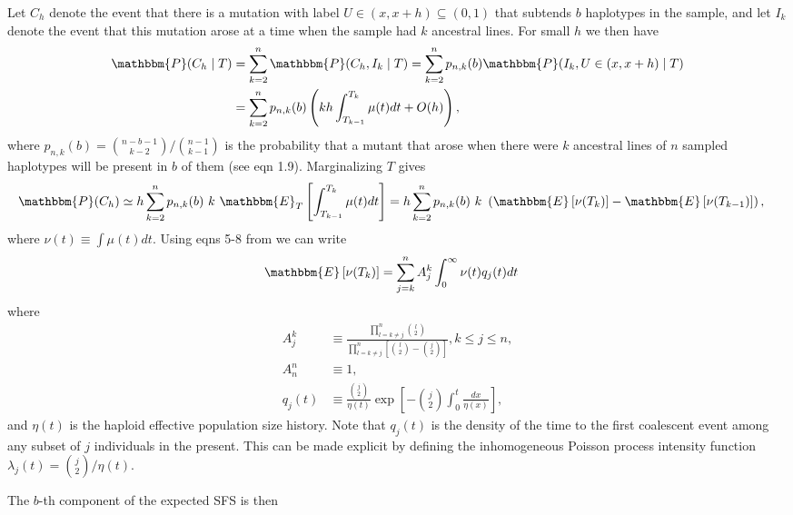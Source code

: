 \documentclass[11pt]{article}
\begin{document}
Let $C_h$ denote the event that there is a mutation with label $U\in(x,x+h)\subseteq(0,1)$ that subtends $b$ haplotypes in the sample, and let $I_k$ denote the event that this mutation arose at a time when the sample had $k$ ancestral lines.
For small $h$ we then have
\begin{align*}
\mathbbm{P}(C_h\mid T) &= \sum_{k=2}^n \mathbbm{P}(C_h, I_k\mid T) = \sum_{k=2}^n p_{n,k}(b)\mathbbm{P}(I_k, U\in(x,x+h)\mid T)\\
&= \sum_{k=2}^n p_{n,k}(b)\left(kh\int_{T_{k-1}}^{T_k}\mu(t)dt + O(h)\right),
\end{align*}
where $p_{n,k}(b) = \binom{n-b-1}{k-2}/\binom{n-1}{k-1}$ is the probability that a mutant that arose when there were $k$ ancestral lines of $n$ sampled haplotypes will be present in $b$ of them (see \cite{Griffiths1998-qf} eqn 1.9).
Marginalizing $T$ gives
\begin{align*}
\mathbbm{P}(C_h) &\simeq h\sum_{k=2}^n p_{n,k}(b)\ k\ \mathbbm{E}_T\left[\int_{T_{k-1}}^{T_k}\mu(t)dt\right] = h\sum_{k=2}^n p_{n,k}(b)\ k\ \left(\mathbbm{E}\left[\nu(T_{k})\right] - \mathbbm{E}\left[\nu(T_{k-1})\right]\right),
\end{align*}
where $\nu(t)\equiv\int\mu(t)dt$.
Using eqns 5-8 from \cite{Polanski2003-kg} we can write
\begin{align*}
\mathbbm{E}\left[\nu(T_{k})\right] &= \sum_{j=k}^n A_j^k\int_0^\infty\nu(t)q_j(t)dt
\end{align*}
where
\begin{align*}
A_j^k &\equiv \frac{\prod_{l=k\ne j}^{n}\binom{l}{2}}{\prod_{l=k\ne j}^{n}\left[\binom{l}{2}-\binom{j}{2}\right]}, k\le j\le n,\\
A_n^n &\equiv 1,\\
q_j(t) &\equiv \frac{\binom{j}{2}}{\eta(t)}\exp\left[-\binom{j}{2}\int_0^t\frac{dx}{\eta(x)}\right],
\end{align*}
and $\eta(t)$ is the haploid effective population size history.
Note that $q_j(t)$ is the density of the time to the first coalescent event among any subset of $j$ individuals in the present.
This can be made explicit by defining the inhomogeneous Poisson process intensity function $\lambda_j(t) = \binom{j}{2}/\eta(t)$.

The $b$-th component of the expected SFS is then
\end{document}
